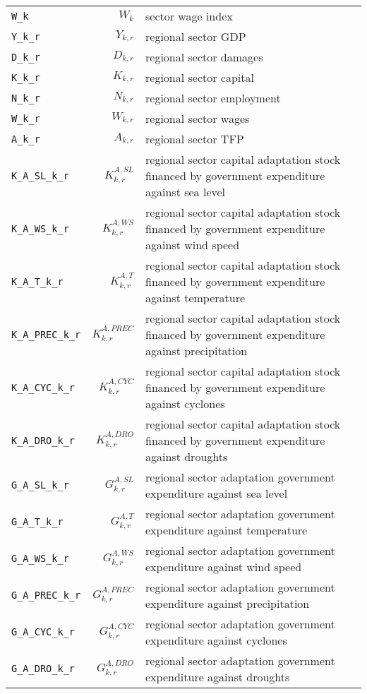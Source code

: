 \begin{center}
\begin{longtable}{lrl}
\texttt{W\_k} & ${W_k}$ & sector wage index\\
\texttt{Y\_k\_r} & ${Y_{k,r}}$ & regional sector GDP\\
\texttt{D\_k\_r} & ${D_{k,r}}$ & regional sector damages\\
\texttt{K\_k\_r} & ${K_{k,r}}$ & regional sector capital\\
\texttt{N\_k\_r} & ${N_{k,r}}$ & regional sector employment\\
\texttt{W\_k\_r} & ${W_{k,r}}$ & regional sector wages\\
\texttt{A\_k\_r} & ${A_{k,r}}$ & regional sector TFP\\
\texttt{K\_A\_SL\_k\_r} & ${K^{A,SL}_{k,r}}$ & regional sector capital adaptation stock financed by government expenditure against sea level\\
\texttt{K\_A\_WS\_k\_r} & ${K^{A,WS}_{k,r}}$ & regional sector capital adaptation stock financed by government expenditure against wind speed\\
\texttt{K\_A\_T\_k\_r} & ${K^{A,T}_{k,r}}$ & regional sector capital adaptation stock financed by government expenditure against temperature\\
\texttt{K\_A\_PREC\_k\_r} & ${K^{A,PREC}_{k,r}}$ & regional sector capital adaptation stock financed by government expenditure against precipitation\\
\texttt{K\_A\_CYC\_k\_r} & ${K^{A,CYC}_{k,r}}$ & regional sector capital adaptation stock financed by government expenditure against cyclones\\
\texttt{K\_A\_DRO\_k\_r} & ${K^{A,DRO}_{k,r}}$ & regional sector capital adaptation stock financed by government expenditure against droughts\\
\texttt{G\_A\_SL\_k\_r} & ${G^{A,SL}_{k,r}}$ & regional sector adaptation government expenditure against sea level\\
\texttt{G\_A\_T\_k\_r} & ${G^{A,T}_{k,r}}$ & regional sector adaptation government expenditure against temperature\\
\texttt{G\_A\_WS\_k\_r} & ${G^{A,WS}_{k,r}}$ & regional sector adaptation government expenditure against wind speed\\
\texttt{G\_A\_PREC\_k\_r} & ${G^{A,PREC}_{k,r}}$ & regional sector adaptation government expenditure against precipitation\\
\texttt{G\_A\_CYC\_k\_r} & ${G^{A,CYC}_{k,r}}$ & regional sector adaptation government expenditure against cyclones\\
\texttt{G\_A\_DRO\_k\_r} & ${G^{A,DRO}_{k,r}}$ & regional sector adaptation government expenditure against droughts\\

\end{longtable}
\end{center}
